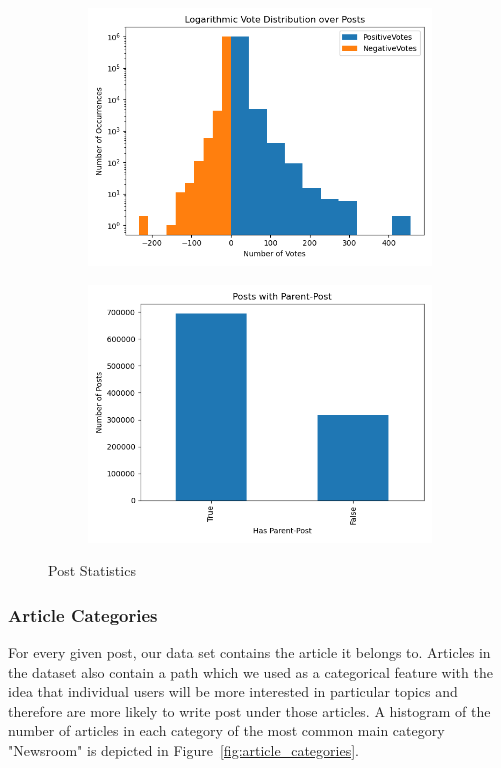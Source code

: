 \documentclass[acmsmall]{acmart}
\begin{document}
\begin{figure}
\centering
\begin{subfigure}{.5\textwidth}
\centering
  \includegraphics[width=.9\linewidth]{assets/Logarithmic_Vote_Distribution_over_Posts.png}
 \end{subfigure}%
\begin{subfigure}{.5\textwidth}
\centering
  \includegraphics[width=.9\linewidth]{assets/Posts_with_parent_post.png}
 \end{subfigure}
 \caption{Post Statistics}
\label{fig:post_stats}
\end{figure}

\subsubsection{Article Categories}
For every given post, our data set contains the article it belongs to. Articles in the dataset also contain a path which we used as a categorical feature with the idea that individual users will be more interested in particular topics and therefore are more likely to write post under those articles. A histogram of the number of articles in each category of the most common main category "Newsroom" is depicted in Figure~\ref{fig:article_categories}.
\end{document}

